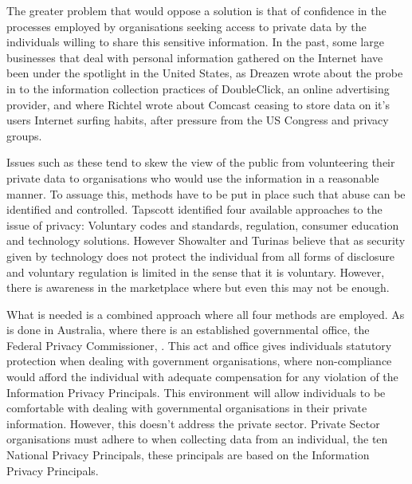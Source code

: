 The greater problem that would oppose a solution is that of confidence in the
processes employed by organisations seeking access to private data by the
individuals willing to share this sensitive information.  In the past, some
large businesses that deal with personal information gathered on the Internet
have been under the spotlight in the United States, as Dreazen wrote about
the probe in to the information collection practices of DoubleClick, an online
advertising provider,  and where Richtel wrote about Comcast ceasing to store
data on it's users Internet surfing habits, after pressure from the US
Congress and privacy groups\cite{nyt-csiwssdoc}.

Issues such as these tend to skew the view of the public from volunteering
their private data to organisations who would use the information in a
reasonable manner. To assuage this, methods have to be put in place such
that abuse can be identified and controlled. Tapscott identified four available
approaches to the issue of privacy: Voluntary codes and standards, regulation,
consumer education and technology solutions\cite{tde}. However Showalter and
Turinas believe that  as security given by technology does not
protect the individual from all forms of disclosure and voluntary regulation
is limited in the sense that it is voluntary. However, there is awareness in
the marketplace where  but even this may not be enough.

What is needed is a combined approach where all four methods are employed. As
is done in Australia, where there is an established governmental office, the
Federal Privacy Commissioner, .
This act and office gives individuals statutory protection when dealing with
government organisations, where non-compliance would afford the individual
with adequate compensation for any violation of the Information Privacy
Principals. This environment will allow individuals to be comfortable with
dealing with governmental organisations in their private information. However,
this doesn't address the private sector. Private Sector organisations must
adhere to when collecting data from an individual, the ten National Privacy
Principals, these principals are based on the Information Privacy Principals.

